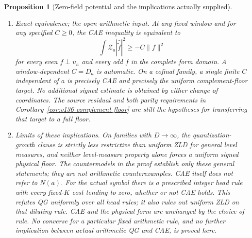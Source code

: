 \documentclass[11pt]{article}
\newtheorem{proposition}[theorem]{Proposition}
\theoremstyle{remark}
\begin{document}
\begin{proposition}[Zero-field potential and the implications actually supplied]
\begin{enumerate}[label=(\roman*)]
\item \emph{Exact equivalence; the open arithmetic input.} At any
fixed window and for any specified $C\ge0$, the CAE inequality is
equivalent to
\begin{equation}\label{eq:v151-zero-floor}
 \int\mathcal Z_a|\widehat{\widetilde f}|^2
       \ge-C\|f\|^2
\end{equation}
for every even $f\perp u_a$ and every odd $f$ in the complete form
domain. A window-dependent $C=D_a$ is automatic. On a cofinal family,
a single finite $C$ independent of $a$ is precisely CAE and precisely
the uniform complement-floor target. No additional signed estimate is
obtained by either change of coordinates. The source residual and
both parity requirements in Corollary~\ref{cor:v136-complement-floor}
are still the hypotheses for transferring that target to a full floor.

\item \emph{Limits of these implications.} On families with $D\to\infty$, the quantization-growth clause is
strictly less restrictive than uniform ZLD for general level measures, and
neither level-measure property alone forces a uniform signed physical
floor. The countermodels in the proof establish only these general
statements; they are not arithmetic counterexamples. CAE itself does
not refer to $N(a)$. For the actual symbol there is a prescribed integer head rule with
every fixed-$K$ cost tending to zero, whether or not CAE holds. This
refutes QG uniformly over all head rules; it also rules out uniform
ZLD on that diluting rule. CAE and the physical form are unchanged
by the choice of rule. No converse for a particular fixed
arithmetic rule, and no further implication between actual arithmetic
QG and CAE, is proved here.
\end{enumerate}
\end{proposition}
\end{document}
